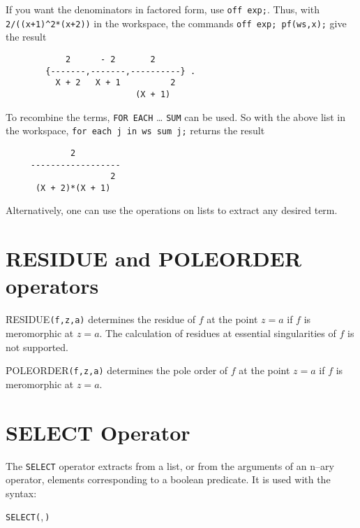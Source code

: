 If you want the denominators in factored form, use \texttt{off exp;}.
Thus, with \texttt{2/((x+1)\textasciicircum2*(x+2))} in the workspace,
the commands \texttt{off exp; pf(ws,x);} give the result
\begin{verbatim}
            2      - 2       2
        {-------,-------,----------} .
          X + 2   X + 1          2
                          (X + 1)
\end{verbatim}

To recombine the terms, \texttt{FOR EACH} \ldots{} \texttt{SUM} can be used.
So with the above list in the workspace,
\texttt{for each j in ws sum j;} returns the result
\begin{verbatim}
             2
     ------------------
                     2
      (X + 2)*(X + 1)
\end{verbatim}

Alternatively, one can use the operations on lists to extract any desired
term.


\section{RESIDUE and POLEORDER operators}
\hypertarget{operator:RESIDUE}{}
\hypertarget{operator:POLEORDER}{}

\f{RESIDUE}\texttt{(f,z,a)} determines the residue of $f$ at the point $z=a$
if $f$ is meromorphic at $z=a$. The calculation of residues at essential
singularities of $f$ is not supported.

\f{POLEORDER}\texttt{(f,z,a)} determines the pole order of $f$ at the point $z=a$
if $f$ is meromorphic at $z=a$.


\section{SELECT Operator}
\hypertarget{operator:SELECT}{}

The \texttt{SELECT} operator extracts from a list,
or from the arguments of an n--ary operator, elements corresponding
to a boolean predicate. It is used with the syntax:
\begin{syntax}
  \texttt{SELECT(},\,\texttt{)}
\end{syntax}


